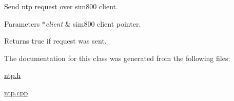 Send ntp request over sim800 client. 


\begin{DoxyParams}{Parameters}
{\em $\ast$client} & sim800 client pointer. \\
\hline
\end{DoxyParams}
\begin{DoxyReturn}{Returns}
true if request was sent. 
\end{DoxyReturn}


The documentation for this class was generated from the following files\+:\begin{DoxyCompactItemize}
\item 
\hyperlink{ntp_8h}{ntp.\+h}\item 
\hyperlink{ntp_8cpp}{ntp.\+cpp}\end{DoxyCompactItemize}
